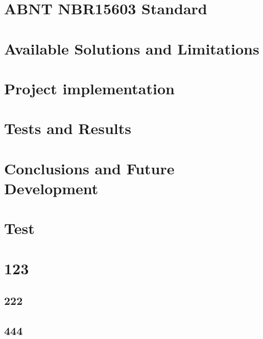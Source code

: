 \documentclass[12pt,a4paper]{article}
\begin{document}
\section{ABNT NBR15603 Standard}

\section{Available Solutions and Limitations}

\section{Project implementation}

\section{Tests and Results}

\section[Conclusions and Future Development]{Conclusions and Future Development}





\appendix
\section{Test}
\newpage
{}
\section{123}
\subsection{222}
\subsection{444}

\newpage
 \TBglossary

\TBcoverpage
\end{document}
